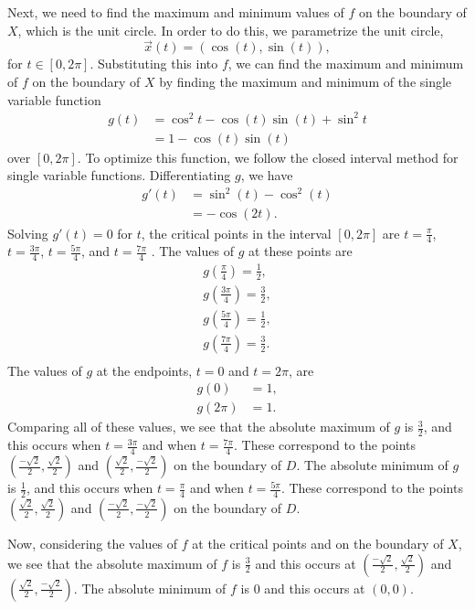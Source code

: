 \documentclass{ximera}
\begin{document}
\begin{example}
Next, we need to find the maximum and minimum values of $f$ on the boundary of $X$, which is the unit circle. In order to do this, we parametrize the unit circle,
\[
\vec{x}(t) = (\cos(t),\sin(t)),
\]
for $t\in [0,2\pi]$. Substituting this into $f$, we can find the maximum and minimum of $f$ on the boundary of $X$ by finding the maximum and minimum of the single variable function
\begin{align*}
g(t) &= \cos^2 t - \cos(t)\sin(t) + \sin^2t\\
&= 1-\cos(t)\sin(t)
\end{align*}
over $[0,2\pi]$. To optimize this function, we follow the closed interval method for single variable functions. Differentiating $g$, we have
\begin{align*}
g'(t) &= \sin^2(t) - \cos^2(t)\\
&= -\cos(2t).
\end{align*}
Solving $g'(t)=0$ for $t$, the critical points in the interval $[0,2\pi]$ are $t=\frac{\pi}{4}$, $t =\frac{3\pi}{4}$, $t = \frac{5\pi}{4}$, and $t = \frac{7\pi}{4}$ . The values of $g$ at these points are
\begin{align*}
g\left(\frac{\pi}{4}\right) = \frac{1}{2},\\
g\left(\frac{3\pi}{4}\right) = \frac{3}{2},\\
g\left(\frac{5\pi}{4}\right) = \frac{1}{2},\\
g\left(\frac{7\pi}{4}\right) = \frac{3}{2}.\\
\end{align*}
The values of $g$ at the endpoints, $t=0$ and $t=2\pi$, are
\begin{align*}
g(0) &= 1,\\
g(2\pi) &= 1.
\end{align*}
Comparing all of these values, we see that the absolute maximum of $g$ is $\frac{3}{2}$, and this occurs when $t=\frac{3\pi}{4}$ and when $t=\frac{7\pi}{4}$. These correspond to the points $\left(\frac{-\sqrt{2}}{2},\frac{\sqrt{2}}{2}\right)$ and $\left(\frac{\sqrt{2}}{2},\frac{-\sqrt{2}}{2}\right)$ on the boundary of $D$. The absolute minimum of $g$ is $\frac{1}{2}$, and this occurs when $t=\frac{\pi}{4}$ and when $t=\frac{5\pi}{4}$. These correspond to the points $\left(\frac{\sqrt{2}}{2},\frac{\sqrt{2}}{2}\right)$ and $\left(\frac{-\sqrt{2}}{2},\frac{-\sqrt{2}}{2}\right)$ on the boundary of $D$.

Now, considering the values of $f$ at the critical points and on the boundary of $X$, we see that the absolute maximum of $f$ is $\frac{3}{2}$ and this occurs at $\left(\frac{-\sqrt{2}}{2},\frac{\sqrt{2}}{2}\right)$ and $\left(\frac{\sqrt{2}}{2},\frac{-\sqrt{2}}{2}\right)$. The absolute minimum of $f$ is $0$ and this occurs at $(0,0)$.


\end{example}
\end{document}

